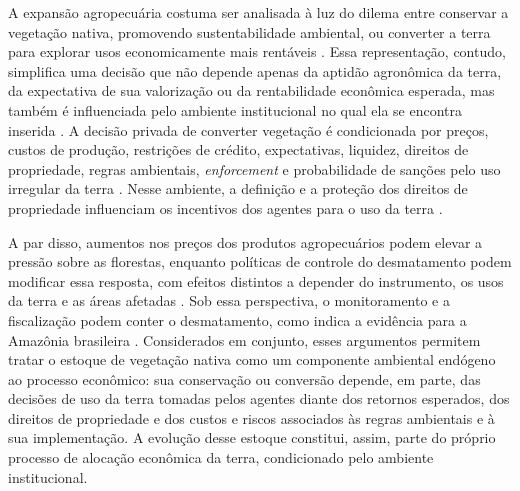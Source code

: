 A expansão agropecuária costuma ser analisada à luz do dilema entre conservar a vegetação nativa, promovendo sustentabilidade ambiental, ou converter a terra para explorar usos economicamente mais rentáveis \cite{Angelsen2010}. Essa representação, contudo, simplifica uma decisão que não depende apenas da aptidão agronômica da terra, da expectativa de sua valorização ou da rentabilidade econômica esperada, mas também é influenciada pelo ambiente institucional no qual ela se encontra inserida \cite{LubowskiEtAl2008}. A decisão privada de converter vegetação é condicionada por preços, custos de produção, restrições de crédito, expectativas, liquidez, direitos de propriedade, regras ambientais, \textit{enforcement} e probabilidade de sanções pelo uso irregular da terra \cite{JungEtAl2022}. Nesse ambiente, a definição e a proteção dos direitos de propriedade influenciam os incentivos dos agentes para o uso da terra \cite{alstonTitlesConflictLand1999}. 

A par disso, aumentos nos preços dos produtos agropecuários podem elevar a pressão sobre as florestas, enquanto políticas de controle do desmatamento podem modificar essa resposta, com efeitos distintos a depender do instrumento, os usos da terra e as áreas afetadas \cite{HardingEtAl2021}. Sob essa perspectiva, o monitoramento e a fiscalização podem conter o desmatamento, como indica a evidência para a Amazônia brasileira \cite{AssuncaoEtAl2023}. Considerados em conjunto, esses argumentos permitem tratar o estoque de vegetação nativa como um componente ambiental endógeno ao processo econômico: sua conservação ou conversão depende, em parte, das decisões de uso da terra tomadas pelos agentes diante dos retornos esperados, dos direitos de propriedade e dos custos e riscos associados às regras ambientais e à sua implementação. A evolução desse estoque constitui, assim, parte do próprio processo de alocação econômica da terra, condicionado pelo ambiente institucional. %

